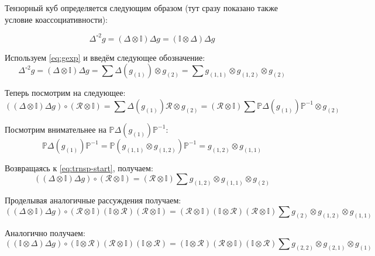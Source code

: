 \documentclass[12pt,a4paper]{article}
\begin{document}
Тензорный куб определяется следующим образом (тут сразу показано также
условие коассоциативности):

\begin{equation}
    \Delta^{\circ 2} g = (\Delta \otimes \mathbb{I})\Delta g =
    (\mathbb{I} \otimes \Delta) \Delta g
    \label{eq:coprod-cube}
\end{equation}

Используем \eqref{eq:gexp} и введём следующее обозначение:
\begin{equation}
    \Delta^{\circ 2} g = (\Delta \otimes \mathbb{I})\Delta g = \sum \Delta (g_{(1)}) 
    \otimes g_{(2)} = \sum g_{(1,1)} \otimes g_{(1,2)} \otimes g_{(2)}
\end{equation}

Теперь посмотрим на следующее:
\begin{equation}
    ((\Delta \otimes \mathbb{I})\Delta g) \circ (\mathcal{R} \otimes \mathbb{I}) = 
    \sum \Delta(g_{(1)}) \mathcal{R} \otimes g_{(2)} =
    (\mathcal{R} \otimes \mathbb{I}) \sum \mathbb{P} \Delta(g_{(1)})
    \mathbb{P}^{-1} \otimes g_{(2)}
    \label{eq:trnsp-start}
\end{equation}

Посмотрим внимательнее на $\mathbb{P} \Delta(g_{(1)})\mathbb{P}^{-1}$:
\begin{equation}
    \mathbb{P} \Delta(g_{(1)})\mathbb{P}^{-1} = \mathbb{P} (g_{(1,1)} \otimes g_{(1,2)})
    \mathbb{P}^{-1} = g_{(1,2)} \otimes g_{(1,1)}
\end{equation}

Возвращаясь к \eqref{eq:trnsp-start}, получаем:
\begin{equation}
    ((\Delta \otimes \mathbb{I})\Delta g) \circ (\mathcal{R} 
    \otimes \mathbb{I}) = (\mathcal{R} 
    \otimes \mathbb{I}) \sum g_{(1,2)} \otimes g_{(1,1)} \otimes g_{(2)}
\end{equation}

Проделывая аналогичные рассуждения получаем:
\begin{equation}
    ((\Delta \otimes \mathbb{I})\Delta g) \circ (\mathcal{R} 
    \otimes \mathbb{I})(\mathbb{I} \otimes \mathcal{R})
    (\mathcal{R} \otimes \mathbb{I}) = (\mathcal{R} 
    \otimes \mathbb{I})(\mathbb{I} \otimes \mathcal{R})
    (\mathcal{R} \otimes \mathbb{I}) \sum g_{(2)} \otimes g_{(1,2)} \otimes g_{(1,1)}
    \label{eq:YB-1}
\end{equation}

Аналогично получаем:
\begin{equation}
    ((\mathbb{I} \otimes \Delta)\Delta g) \circ (\mathbb{I} \otimes \mathcal{R})
    (\mathcal{R} \otimes \mathbb{I}) (\mathbb{I} \otimes \mathcal{R}) = 
    (\mathbb{I} \otimes \mathcal{R})
    (\mathcal{R} \otimes \mathbb{I}) (\mathbb{I} \otimes \mathcal{R}) 
    \sum g_{(2, 2)} \otimes g_{(2,1)} \otimes g_{(1)}
    \label{eq:YB-2}
\end{equation}
\end{document}
